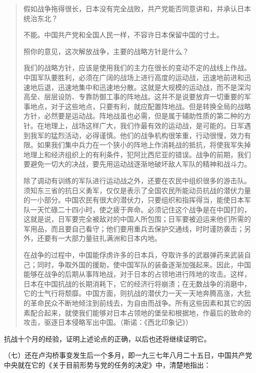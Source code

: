 \begin{quote}
\begin{description}[qa]
\item[问：]假如战争拖得很长，日本没有完全战败，共产党能否同意讲和，并承认日本统治东北？
\item[答：]不能。中国共产党和全国人民一样，不容许日本保留中国的寸土。
\item[问：]照你的意见，这次解放战争，主要的战略方针是什么？
\item[答：]我们的战略方针，应该是使用我们的主力在很长的变动不定的战线上作战。中国军队要胜利，必须在广阔的战场上进行高度的运动战，迅速地前进和迅速地后退，迅速地集中和迅速地分散。这就是大规模的运动战，而不是深沟高垒、层层设防、专靠防御工事的阵地战。这并不是说要放弃一切重要的军事地点，对于这些地点，只要有利，就应配置阵地战。但是转换全局的战略方针，必然要是运动战。阵地战虽也必需，但是属于辅助性质的第二种的方针。在地理上，战场这样广大，我们作最有效的运动战，是可能的。日军遇到我军的猛烈活动，必得谨慎。他们的战争机构很笨重，行动很慢，效力有限。如果我们集中兵力在一个狭小的阵地上作消耗战的抵抗，将使我军失掉地理上和经济组织上的有利条件，犯阿比西尼亚的错误。战争的前期，我们要避免一切大的决战，要先用运动战逐渐地破坏敌人军队的精神和战斗力。

除了调动有训练的军队进行运动战之外，还要在农民中组织很多的游击队。须知东三省的抗日义勇军，仅仅是表示了全国农民所能动员抗战的潜伏力量的一小部分。中国农民有很大的潜伏力，只要组织和指挥得当，能使日本军队一天忙碌二十四小时，使之疲于奔命。必须记住这个战争是在中国打的，这就是说，日军要完全被敌对的中国人所包围；日军要被迫运来他们所需的军用品，而且要自己看守；他们要用重兵去保护交通线，时时谨防袭击；另外，还要有一大部力量驻扎满洲和日本内地。

在战争的过程中，中国能俘虏许多的日本兵，夺取许多的武器弹药来武装自己；同时，争取外国的援助，使中国军队的装备逐渐加强起来。因此，中国能够在战争的后期从事阵地战，对于日本的占领地进行阵地的攻击。这样，日本在中国抗战的长期消耗下，它的经济行将崩溃；在无数战争的消磨中，它的士气行将颓靡。中国方面，则抗战的潜伏力一天一天地奔腾高涨，大批的革命民众不断地倾注到前线去，为自由而战争。所有这些因素和其它的因素配合起来，就使我们能够对日本占领地的堡垒和根据地，作最后的致命的攻击，驱逐日本侵略军出中国。（斯诺：《西北印象记》）
\end{description}
\end{quote}

抗战十个月的经验，证明上述论点的正确，以后也还将继续证明它。

（七）还在卢沟桥事变发生后一个多月，即一九三七年八月二十五日，中国共产党中央就在它的《关于目前形势与党的任务的决定》中，清楚地指出：

